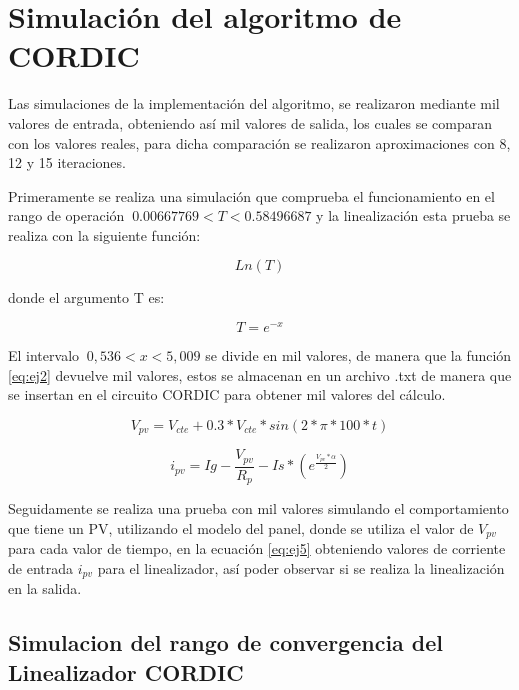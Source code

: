 \section{Simulación del algoritmo de CORDIC}

Las simulaciones de la implementación del algoritmo, se realizaron mediante mil valores de entrada, obteniendo así mil valores de salida, los cuales se comparan con los valores reales, para dicha comparación se realizaron aproximaciones con 8, 12 y 15 iteraciones. 

Primeramente se realiza una simulación que comprueba el funcionamiento en el rango de operación $\ 0.00667769 < T < 0.58496687 $ y la linealización esta prueba se realiza con la siguiente función: 

\begin{equation} \label{eq:ej2}
  Ln \left(T \right) 
\end{equation} 

donde el argumento T es:

\begin{equation} \label{eq:ej3}
   T = e^{-x}         
\end{equation} 
  
El intervalo $\ 0,536 < x < 5,009$ se divide en mil valores, de manera que la función \ref{eq:ej2} devuelve mil valores, estos se almacenan en un archivo .txt de manera que se insertan en el circuito CORDIC para obtener mil valores del cálculo. 


\begin{equation} \label{eq:ej4}
   V_{pv} = V_{cte} + 0.3*V_{cte}*sin(2* \pi *100*t)     
\end{equation}


    
\begin{equation} \label{eq:ej5}
   i_{pv} = Ig - \frac{V_{pv}}{R_p} - Is*\left(e^\frac{V_{pv}* \alpha}{2}\right)         
\end{equation} 


Seguidamente se realiza una prueba con mil valores simulando el comportamiento que tiene un PV, utilizando el modelo del panel, donde se utiliza el valor de $ V_{pv} $ para cada valor de tiempo, en la ecuación \ref{eq:ej5} obteniendo valores de corriente de entrada $ i_{pv} $ para el linealizador, así poder observar si se realiza la linealización en la salida. 



\subsection{Simulacion del rango de convergencia del Linealizador CORDIC}

